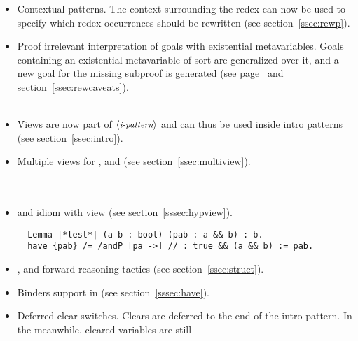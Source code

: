 \begin{itemize}
\item Contextual  patterns.
      The context surrounding the redex can now be used to specify which
      redex occurrences should be rewritten (see section~\ref{ssec:rewp}).\\
\item Proof irrelevant interpretation of goals with existential metavariables.
      Goals containing an existential metavariable of sort  are
      generalized over it, and a new goal for the missing subproof is 
      generated (see page~\pageref{sssec:apply} and 
      section~\ref{ssec:rewcaveats}).\\
      \\
\item Views are now part of $\langle\mbox{\itshape\rmfamily\small i-pattern}\rangle$ and can thus be used
      inside intro patterns (see section~\ref{ssec:intro}).\\
\item Multiple views for ,  and  
      (see section~\ref{ssec:multiview}).\\
      \\
      \\
\item {} and  idiom with view (see section~\ref{sssec:hypview}).
\begin{lstlisting}
  Lemma |*test*| (a b : bool) (pab : a && b) : b.
  have {pab} /= /andP [pa ->] // : true && (a && b) := pab.
\end{lstlisting}
\item {},  and  forward reasoning 
      tactics (see section~\ref{ssec:struct}).\\
\item Binders support in  (see section~\ref{sssec:have}).\\
\item Deferred clear switches. Clears are deferred to the end of the 
      intro pattern. In the meanwhile, cleared variables are still

\end{itemize}
